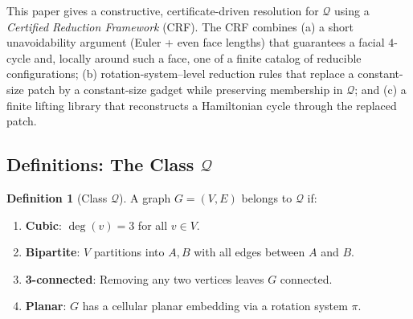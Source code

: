 \documentclass[12pt]{article}
\theoremstyle{definition}
\newtheorem{definition}[theorem]{Definition}
\begin{document}
This paper gives a constructive, certificate-driven resolution for $\mathcal{Q}$ using a \emph{Certified Reduction Framework} (CRF).
The CRF combines (a) a short unavoidability argument (Euler + even face lengths) that guarantees a facial $4$-cycle and, locally around such a face, one of a finite catalog of reducible configurations;
(b) rotation-system--level reduction rules that replace a constant-size patch by a constant-size gadget while preserving membership in $\mathcal{Q}$;
and (c) a finite lifting library that reconstructs a Hamiltonian cycle through the replaced patch.

\subsection{Definitions: The Class \texorpdfstring{$\mathcal{Q}$}{Q}}
\begin{definition}[Class $\mathcal{Q}$]
A graph $G = (V, E)$ belongs to $\mathcal{Q}$ if:
\begin{enumerate}
    \item \textbf{Cubic}: $\deg(v) = 3$ for all $v \in V$.
    \item \textbf{Bipartite}: $V$ partitions into $A, B$ with all edges between $A$ and $B$.
    \item \textbf{3-connected}: Removing any two vertices leaves $G$ connected.
    \item \textbf{Planar}: $G$ has a cellular planar embedding via a rotation system $\pi$.
\end{enumerate}
\end{definition}
\end{document}
